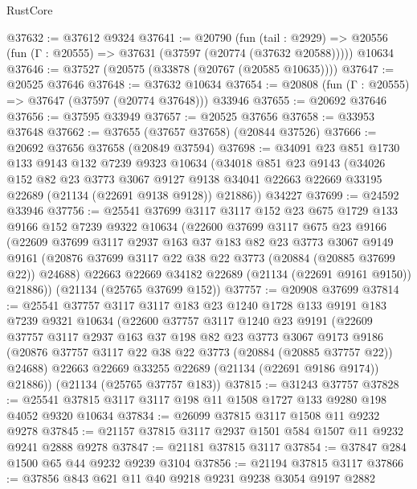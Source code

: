 \begin{lexlean}{RustCore}
\begin{coremodule}
@37632 := @37612 @9324
@37641 := @20790
    (fun (tail : @2929) => @20556 (fun (Γ : @20555) => @37631 (@37597 (@20774 (@37632 @20588)))))
    @10634
@37646 := @37527 (@20575 (@33878 (@20767 (@20585 @10635))))
@37647 := @20525 @37646
@37648 := @37632 @10634
@37654 := @20808 (fun (Γ : @20555) => @37647 (@37597 (@20774 @37648))) @33946
@37655 := @20692 @37646
@37656 := @37595 @33949
@37657 := @20525 @37656
@37658 := @33953 @37648
@37662 := @37655 (@37657 @37658) (@20844 @37526)
@37666 := @20692 @37656 @37658 (@20849 @37594)
@37698 := @34091
    @23
    @851
    @1730
    @133
    @9143
    @132
    @7239
    @9323
    @10634
    (@34018
      @851
      @23
      @9143
      (@34026
        @152
        @82
        @23
        @3773
        @3067
        @9127
        @9138
        @34041
        @22663
        @22669
        @33195
        @22689
        (@21134 (@22691 @9138 @9128))
        @21886))
    @34227
@37699 := @24592 @33946
@37756 := @25541
    @37699
    @3117
    @3117
    @152
    @23
    @675
    @1729
    @133
    @9166
    @152
    @7239
    @9322
    @10634
    (@22600
      @37699
      @3117
      @675
      @23
      @9166
      (@22609
        @37699
        @3117
        @2937
        @163
        @37
        @183
        @82
        @23
        @3773
        @3067
        @9149
        @9161
        (@20876 @37699 @3117 @22 @38 @22 @3773 (@20884 (@20885 @37699 @22)) @24688)
        @22663
        @22669
        @34182
        @22689
        (@21134 (@22691 @9161 @9150))
        @21886))
    (@21134 (@25765 @37699 @152))
@37757 := @20908 @37699
@37814 := @25541
    @37757
    @3117
    @3117
    @183
    @23
    @1240
    @1728
    @133
    @9191
    @183
    @7239
    @9321
    @10634
    (@22600
      @37757
      @3117
      @1240
      @23
      @9191
      (@22609
        @37757
        @3117
        @2937
        @163
        @37
        @198
        @82
        @23
        @3773
        @3067
        @9173
        @9186
        (@20876 @37757 @3117 @22 @38 @22 @3773 (@20884 (@20885 @37757 @22)) @24688)
        @22663
        @22669
        @33255
        @22689
        (@21134 (@22691 @9186 @9174))
        @21886))
    (@21134 (@25765 @37757 @183))
@37815 := @31243 @37757
@37828 := @25541 @37815 @3117 @3117 @198 @11 @1508 @1727 @133 @9280 @198 @4052 @9320 @10634
@37834 := @26099 @37815 @3117 @1508 @11 @9232 @9278
@37845 := @21157 @37815 @3117 @2937 @1501 @584 @1507 @11 @9232 @9241 @2888 @9278
@37847 := @21181 @37815 @3117
@37854 := @37847 @284 @1500 @65 @44 @9232 @9239 @3104
@37856 := @21194 @37815 @3117
@37866 := @37856 @843 @621 @11 @40 @9218 @9231 @9238 @3054 @9197 @2882

\end{coremodule}
\end{lexlean}
